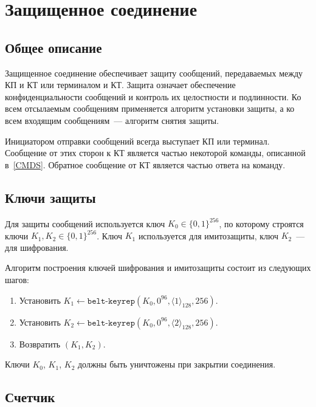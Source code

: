 \section{Защищенное соединение}\label{CRYPTO.SM}

\subsection{Общее описание}

Защищенное соединение обеспечивает защиту сообщений, передаваемых между КП 
и КТ или терминалом и КТ. Защита означает обеспечение конфиденциальности сообщений 
и контроль их целостности и подлинности. Ко всем отсылаемым сообщениям 
применяется алгоритм установки защиты, а ко всем входящим сообщениям~--- 
алгоритм снятия защиты.

Инициатором отправки сообщений всегда выступает КП или терминал.
Сообщение от этих сторон к КТ является частью некоторой команды, 
описанной в~\ref{CMDS}. 
Обратное сообщение от КТ является частью ответа на команду.

\subsection{Ключи защиты}

Для защиты сообщений используется ключ $K_0\in\{0,1\}^{256}$, по которому строятся 
ключи $K_1, K_2 \in\{0,1\}^{256}$. Ключ $K_1$ используется для имитозащиты, 
ключ $K_2$~--- для шифрования.

Алгоритм построения ключей шифрования и имитозащиты состоит из следующих шагов:

\begin{enumerate}
\item
Установить 
$K_1\gets\texttt{belt-keyrep}(K_0, 0^{96}, \langle 1 \rangle_{128}, 256)$.

\item
Установить 
$K_2\gets\texttt{belt-keyrep}(K_0, 0^{96}, \langle 2 \rangle_{128}, 256)$.

\item
Возвратить $(K_1, K_2)$.
\end{enumerate}

Ключи $K_0$, $K_1$, $K_2$ должны быть уничтожены при закрытии соединения.

\subsection{Счетчик}\label{CRYPTO.SM.Ctr}

